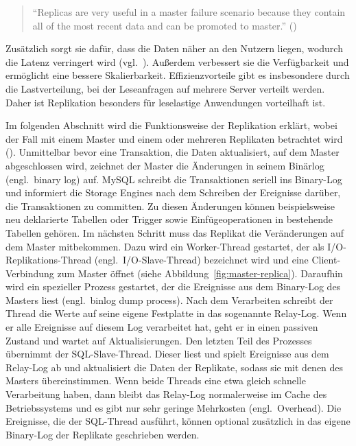 \begin{quote}
  \enquote{Replicas are very useful in a master failure scenario because they contain all of the most recent data and can be promoted to master.} (\cite[S. 148]{da2015redis})
\end{quote}

Zusätzlich sorgt sie dafür, dass die Daten näher an den Nutzern liegen, wodurch die Latenz verringert wird (vgl.\ \cite[S. 151]{kleppmann2017designing}).
Außerdem verbessert sie die Verfügbarkeit und ermöglicht eine bessere Skalierbarkeit.
Effizienzvorteile gibt es insbesondere durch die Lastverteilung, bei der Leseanfragen auf mehrere Server verteilt werden.
Daher ist Replikation besonders für leselastige Anwendungen vorteilhaft ist.

Im folgenden Abschnitt wird die Funktionsweise der Replikation erklärt, wobei der Fall mit einem Master und einem oder mehreren Replikaten betrachtet wird (\cite[S. 447--477]{schwartz2012high}).
Unmittelbar bevor eine Transaktion, die Daten aktualisiert, auf dem Master abgeschlossen wird, zeichnet der Master die Änderungen in seinem Binärlog (engl.\ binary log) auf.
MySQL schreibt die Transaktionen seriell ins Binary-Log und informiert die Storage Engines nach dem Schreiben der Ereignisse darüber, die Transaktionen zu committen.
Zu diesen Änderungen können beispielsweise neu deklarierte Tabellen oder Trigger sowie Einfügeoperationen in bestehende Tabellen gehören.
Im nächsten Schritt muss das Replikat die Veränderungen auf dem Master mitbekommen.
Dazu wird ein Worker-Thread gestartet, der als I/O-Replikations-Thread (engl.\ I/O-Slave-Thread) bezeichnet wird und eine Client-Verbindung zum Master öffnet (siehe Abbildung~\ref{fig:master-replica}).
Daraufhin wird ein spezieller Prozess gestartet, der die Ereignisse aus dem Binary-Log des Masters liest (engl.\ binlog dump process).
Nach dem Verarbeiten schreibt der Thread die Werte auf seine eigene Festplatte in das sogenannte Relay-Log.
Wenn er alle Ereignisse auf diesem Log verarbeitet hat, geht er in einen passiven Zustand und wartet auf Aktualisierungen.
Den letzten Teil des Prozesses übernimmt der SQL-Slave-Thread.
Dieser liest und spielt Ereignisse aus dem Relay-Log ab und aktualisiert die Daten der Replikate, sodass sie mit denen des Masters übereinstimmen.
Wenn beide Threads eine etwa gleich schnelle Verarbeitung haben, dann bleibt das Relay-Log normalerweise im Cache des Betriebssystems und es gibt nur sehr geringe Mehrkosten (engl.\ Overhead).
Die Ereignisse, die der SQL-Thread ausführt, können optional zusätzlich in das eigene Binary-Log der Replikate geschrieben werden.

